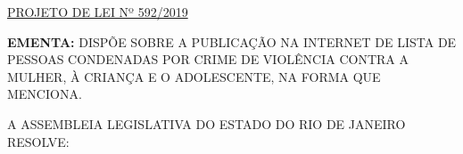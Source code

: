 \documentclass[10pt]{article}
\date{}
\begin{document}
\maketitle
\begin{center}
  \huge
  \vspace{-3cm}\href{http://alerjln1.alerj.rj.gov.br/scpro1923.nsf/f4b46b3cdbba990083256cc900746cf6/bbc5ef2acdc927a98325840200646354?OpenDocument}{PROJETO DE LEI Nº 592/2019}
\bigskip
\bigskip
\bigskip
  
\end{center}

\textbf{EMENTA:} 
DISPÕE SOBRE A PUBLICAÇÃO NA INTERNET DE LISTA DE PESSOAS CONDENADAS POR CRIME DE VIOLÊNCIA CONTRA A MULHER, À CRIANÇA E O ADOLESCENTE, NA FORMA QUE MENCIONA.








\bigskip

\noindent
A ASSEMBLEIA LEGISLATIVA DO ESTADO DO RIO DE JANEIRO RESOLVE:
\end{document}

